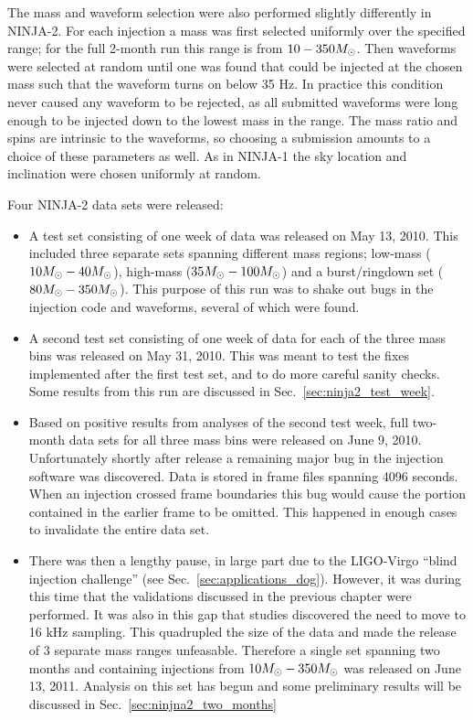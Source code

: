The mass and waveform selection were also performed slightly
differently in NINJA-2.  For each injection a mass was first selected
uniformly over the specified range; for the full 2-month run this
range is from $10-350 M_\odot$.  Then waveforms were selected at random
until one was found that could be injected at the chosen mass such
that the waveform turns on below 35 Hz.  In practice this condition
never caused any waveform to be rejected, as all submitted waveforms
were long enough to be injected down to the lowest mass in the range.
The mass ratio and spins are intrinsic to the waveforms, so choosing a
submission amounts to a choice of these parameters as well.  As in
NINJA-1 the sky location and inclination were chosen uniformly at
random.

Four NINJA-2 data sets were released:

\begin{itemize}
\item A test set consisting of one week of data was released on May 13, 2010.  This
included three separate sets spanning different mass regions;
low-mass ($10M_\odot - 40 M_\odot$), high-mass ($35 M_\odot - 100 M_\odot$)
and a burst/ringdown set ($80 M_\odot - 350 M_\odot$).  This purpose of
this run was to shake out bugs in the injection code and waveforms,
several of which were found.

\item A second test set consisting of one week of data for each of the
three mass bins was released on May 31, 2010.  This was meant to test
the fixes implemented after the first test set, and to do more
careful sanity checks.  Some results from this run are discussed in
Sec.~\ref{sec:ninja2_test_week}.

\item Based on positive results from analyses of the second test week,
full two-month data sets for all three mass bins were released on June
9, 2010.  Unfortunately shortly after release a remaining major bug in
the injection software was discovered.  Data is stored in frame files
spanning 4096 seconds.  When an injection crossed frame boundaries
this bug would cause the portion contained in the earlier frame to be
omitted.  This happened in enough cases to invalidate the entire data
set.

\item There was then a lengthy pause, in large part due to the
LIGO-Virgo ``blind injection challenge'' (see
Sec.~\ref{sec:applications_dog}).  However, it was during this time
that the validations discussed in the previous chapter were performed.
It was also in this gap that studies discovered the need to move to
16 kHz sampling.   This quadrupled the size of the data and made the
release of 3 separate mass ranges unfeasable.  Therefore a single set
spanning two months and containing injections from $10 M_\odot - 350
M_\odot$ was released on June 13, 2011.  Analysis on this set has begun
and some preliminary results will be discussed in
Sec.~\ref{sec:ninjna2_two_months}
\end{itemize}


